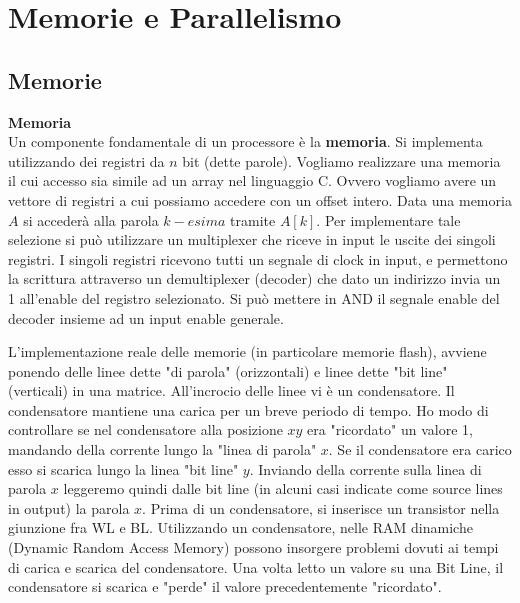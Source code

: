 \chapter{Memorie e Parallelismo}

\section{Memorie}

\begin{defn}
	\textbf{Memoria} \\
	
	Un componente fondamentale di un processore è la \textbf{memoria}. Si
	implementa utilizzando dei registri da $ n $ bit (dette parole). Vogliamo
	realizzare una memoria il cui accesso sia simile ad un array nel linguaggio
	C. Ovvero vogliamo avere un vettore di registri a cui possiamo accedere con
	un offset intero. Data una memoria $ A $ si accederà alla parola $ k-esima $
	tramite $ A[k] $. Per implementare tale selezione si può utilizzare un
	multiplexer che riceve in input le uscite dei singoli registri. I singoli
	registri ricevono tutti un segnale di clock in input, e permettono la
	scrittura attraverso un demultiplexer (decoder) che dato un indirizzo invia
	un 1 all'enable del registro selezionato. Si può mettere in AND il segnale
	enable del decoder insieme ad un input enable generale.

	L'implementazione reale delle memorie (in particolare memorie flash),
	avviene ponendo delle linee dette "di parola" (orizzontali) e linee dette
	"bit line" (verticali) in una matrice. All'incrocio delle linee vi è un
	condensatore. Il condensatore mantiene una carica per un breve periodo di
	tempo. Ho modo di controllare se nel condensatore alla posizione $ xy $ era
	"ricordato" un valore 1, mandando della corrente lungo la "linea di parola"
	$ x $. Se il condensatore era carico esso si scarica lungo la linea "bit
	line" $ y $. Inviando della corrente sulla linea di parola $ x $ leggeremo
	quindi dalle bit line (in alcuni casi indicate come source lines in output)
	la parola $ x $. Prima di un condensatore, si inserisce un transistor nella
	giunzione fra WL e BL. Utilizzando un condensatore, nelle RAM dinamiche
	(Dynamic Random Access Memory) possono insorgere problemi dovuti ai tempi di
	carica e scarica del condensatore. Una volta letto un valore su una Bit
	Line, il condensatore si scarica e "perde" il valore precedentemente
	"ricordato".
	
	

\end{defn}

